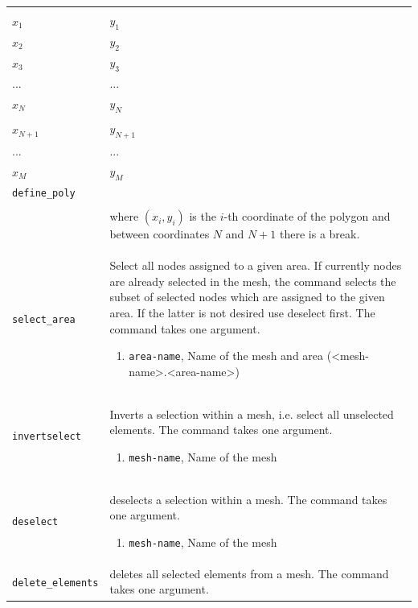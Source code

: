 \documentclass[noshowpacs,preprintnumbers,amsmath,amssymb, letter]{revtex4}
\begin{document}
\begin{longtable}{p{}p{}}
&
\begin{tabular}{ll}
	\texttt{define\_poly} \\
	$x_1$ & $y_1$ \\
	$x_2$ & $y_2$ \\
	$x_3$ & $y_3$ \\
	... & ... \\
	$x_N$ & $y_N$ \\
	\\
	$x_{N+1}$ & $y_{N+1}$ \\
	... & ... \\
	$x_M$ & $y_M$ \\
	\texttt{define\_poly} \\
\end{tabular}\\
&where $(x_i,y_i)$ is the $i$-th coordinate of the polygon and between coordinates $N$ and $N+1$ there is a break.\\
\texttt{select\_area}	& Select all nodes assigned to a given area. If currently nodes are already selected in the mesh, the command selects the subset of selected nodes which are assigned to the given area. If the latter is not desired use deselect first. The command takes one argument.
\begin{enumerate}
\item \texttt{area-name}, Name of the mesh and area (\textless mesh-name\textgreater .\textless area-name\textgreater )
\end{enumerate}\\
\texttt{invertselect}	& Inverts a selection within a mesh, i.e. select all unselected elements. The command takes one argument.
\begin{enumerate}
\item \texttt{mesh-name}, Name of the mesh
\end{enumerate}\\
\texttt{deselect}	& deselects a selection within a mesh. The command takes one argument.
\begin{enumerate}
\item \texttt{mesh-name}, Name of the mesh
\end{enumerate}\\
\texttt{delete\_elements}	& deletes all selected elements from a mesh. The command takes one argument.

\end{longtable}
\end{document}
